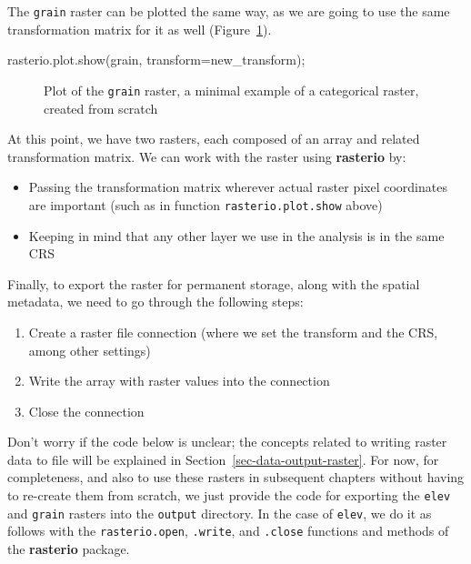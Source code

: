 \documentclass[
  letterpaper,
]{krantz}
\newenvironment{Shaded}{\begin{snugshade}}{\end{snugshade}}
\newcommand{\NormalTok}[1]{\textcolor[rgb]{0.00,0.23,0.31}{#1}}
\newcommand{\OperatorTok}[1]{\textcolor[rgb]{0.37,0.37,0.37}{#1}}
\providecommand{\tightlist}{%
  \setlength{\itemsep}{0pt}\setlength{\parskip}{0pt}}\usepackage{longtable,booktabs,array}
\begin{document}
The \texttt{grain} raster can be plotted the same way, as we are going
to use the same transformation matrix for it as well
(Figure~\ref{fig-rasterio-plot-grain}).

\begin{Shaded}
\begin{Highlighting}[]
\NormalTok{rasterio.plot.show(grain, transform}\OperatorTok{=}\NormalTok{new\_transform)}\OperatorTok{;}
\end{Highlighting}
\end{Shaded}

\begin{figure}[H]


\caption{\label{fig-rasterio-plot-grain}Plot of the \texttt{grain}
raster, a minimal example of a categorical raster, created from scratch}

\end{figure}%

At this point, we have two rasters, each composed of an array and
related transformation matrix. We can work with the raster using
\textbf{rasterio} by:

\begin{itemize}
\tightlist
\item
  Passing the transformation matrix wherever actual raster pixel
  coordinates are important (such as in function
  \texttt{rasterio.plot.show} above)
\item
  Keeping in mind that any other layer we use in the analysis is in the
  same CRS
\end{itemize}

Finally, to export the raster for permanent storage, along with the
spatial metadata, we need to go through the following steps:

\begin{enumerate}
\def\labelenumi{\arabic{enumi}.}
\tightlist
\item
  Create a raster file connection (where we set the transform and the
  CRS, among other settings)
\item
  Write the array with raster values into the connection
\item
  Close the connection
\end{enumerate}

Don't worry if the code below is unclear; the concepts related to
writing raster data to file will be explained in
Section~\ref{sec-data-output-raster}. For now, for completeness, and
also to use these rasters in subsequent chapters without having to
re-create them from scratch, we just provide the code for exporting the
\texttt{elev} and \texttt{grain} rasters into the \texttt{output}
directory. In the case of \texttt{elev}, we do it as follows with the
\texttt{rasterio.open}, \texttt{.write}, and \texttt{.close} functions
and methods of the \textbf{rasterio} package.
\end{document}
